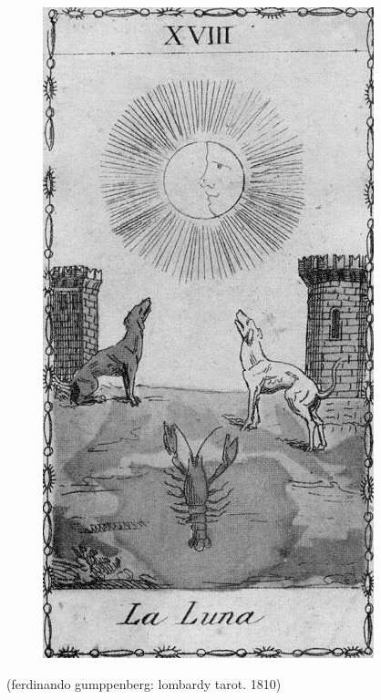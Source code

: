 \documentclass[12pt,a4paper,british,landscape]{article}
\begin{document}
\begin{figure}[h]
    \vspace{0.15cm}
    \begin{center}
        \includegraphics[scale=0.6]{tarot.jpg}
    \end{center}
\end{figure}

\begin{center}
    (ferdinando gumppenberg: lombardy tarot. 1810)
\end{center}
\end{document}
